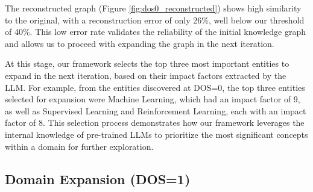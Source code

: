 \documentclass[11pt]{article}
\begin{document}
The reconstructed graph (Figure \ref{fig:dos0_reconstructed}) shows high similarity to the original, with a reconstruction error of only 26\%, well below our threshold of 40\%. This low error rate validates the reliability of the initial knowledge graph and allows us to proceed with expanding the graph in the next iteration.

At this stage, our framework selects the top three most important entities to expand in the next iteration, based on their impact factors extracted by the LLM. For example, from the entities discovered at DOS=0, the top three entities selected for expansion were Machine Learning, which had an impact factor of 9, as well as Supervised Learning and Reinforcement Learning, each with an impact factor of 8. This selection process demonstrates how our framework leverages the internal knowledge of pre-trained LLMs to prioritize the most significant concepts within a domain for further exploration.

\subsection{Domain Expansion (DOS=1)}
\end{document}
